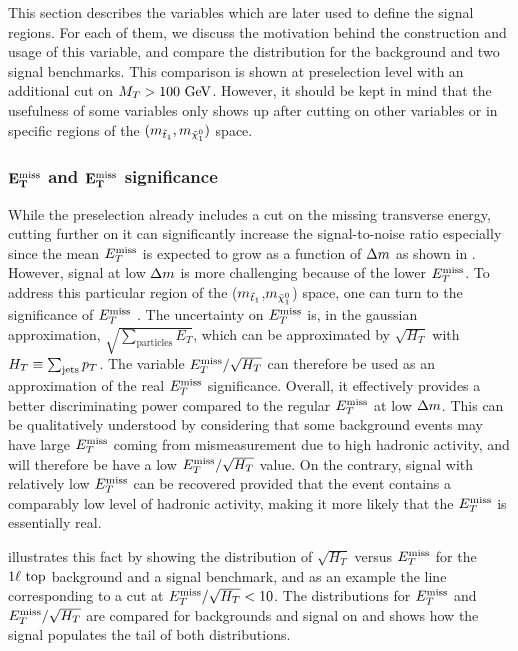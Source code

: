     This section describes the variables which are later used to define the
    signal regions. For each of them, we discuss the motivation behind the construction
    and usage of this variable, and compare the distribution for the background
    and two signal benchmarks. This comparison is shown at preselection level with
    an additional cut on $M_T > 100~\text{GeV}$. However, it should be kept in mind that the
    usefulness of some variables only shows up after cutting on other variables or in
    specific regions of the $(m_{\tilde{t}_1},m_{\tilde{\chi}_1^0})$ space.

    \subsubsection{$\mathbf{E_T^\text{miss}}$ and $\mathbf{E_T^\text{miss}}$ significance}

    While the preselection already includes a cut on the missing transverse energy,
    cutting further on it can significantly increase the signal-to-noise ratio especially
    since the mean $E_T^\text{miss}$ is expected to grow as a function of $\Delta m$ as shown
    in . However, signal
    at low $\Delta m$ is more challenging because of the lower $E_T^\text{miss}$. To address this
    particular region of the ($m_{\tilde{t}_1}$,$m_{\tilde{\chi}_1^0}$) space, one
    can turn to the significance of $E_T^\text{miss}$ \cite{METperf, METsignificanceMirman}. The
    uncertainty on $E_T^\text{miss}$ is, in the gaussian approximation, $\sqrt{\sum_\text{particles} E_T}$,
    which can be approximated by $\sqrt{H_T}$ with $H_T \equiv \sum_\text{jets} p_T$.
    The variable $E_T^\text{miss} / \sqrt{H_T}$ can therefore be used as an approximation of the
    real $E_T^\text{miss}$ significance. Overall, it effectively provides a better discriminating
    power compared to the regular $E_T^\text{miss}$ at low $\Delta m$. This can be qualitatively understood
    by considering that some background events may have large $E_T^\text{miss}$ coming
    from mismeasurement due to high hadronic activity, and will therefore be have
    a low $E_T^\text{miss}/\sqrt{H_T}$ value. On the contrary, signal with relatively low $E_T^\text{miss}$
    can be recovered provided that the event contains a comparably low level of hadronic
    activity, making it more likely that the $E_T^\text{miss}$ is essentially real.

     illustrates this fact by showing the distribution of
    $\sqrt{H_T}$ versus $E_T^\text{miss}$ for the $1\ell~\text{top}$ background and a signal benchmark, and
    as an example the line corresponding to a cut at $E_T^\text{miss} / \sqrt{H_T} < 10$. The distributions
    for $E_T^\text{miss}$ and $E_T^\text{miss} / \sqrt{H_T}$ are compared for backgrounds and signal on
     and shows how the signal populates the
    tail of both distributions.


